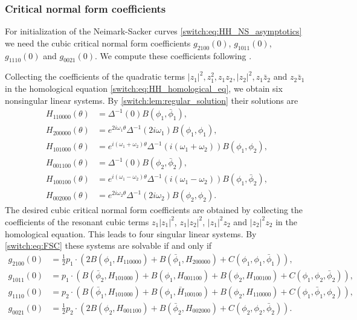 \subsubsection{Critical normal form coefficients}
For initialization of the Neimark-Sacker curves \cref{switch:eq:HH_NS_asymptotics} we need the cubic critical normal form coefficients $g_{2100}(0)$, $g_{1011}(0)$, $g_{1110}(0)$ and $g_{0021}(0)$. We compute these coefficients following \cite{Janssens:Thesis}.

Collecting the coefficients of the quadratic terms $|z_{1}|^{2},z_{1}^{2},z_{1}z_{2},|z_{2}|^{2},z_{1}\bar{z}_{2}$ and $z_{2}\bar{z}_{1}$ in the homological equation \cref{switch:eq:HH_homological_eq}, we obtain six nonsingular linear systems. By \cref{switch:lem:regular_solution} their solutions are
\begin{align*}
H_{110000}(\theta)& = \Delta^{-1}(0)B(\phi_{1},\bar{\phi}_{1}),\\
H_{200000}(\theta)& = e^{2i\omega_{1}\theta}\Delta^{-1}(2i\omega_{1})B(\phi_{1},\phi_{1}),\\
H_{101000}(\theta)& = e^{i\left(\omega_{1}+\omega_{2}\right)\theta}\Delta^{-1}(i\left(\omega_{1}+\omega_{2}\right))B(\phi_{1},\phi_{2}),\\
H_{001100}(\theta)& = \Delta^{-1}(0)B(\phi_{2},\bar{\phi}_{2}),\\
H_{100100}(\theta)& = e^{i\left(\omega_{1}-\omega_{2}\right)\theta}\Delta^{-1}(i\left(\omega_{1}-\omega_{2}\right))B(\phi_{1},\bar{\phi}_{2}),\\
H_{002000}(\theta)& = e^{2i\omega_{2}\theta}\Delta^{-1}(2i\omega_{2})B(\phi_{2},\phi_{2}).
\end{align*}
The desired cubic critical normal form coefficients are obtained by collecting the coefficients of the resonant cubic terms $z_{1}|z_{1}|^{2}$, $z_1|z_{2}|^{2}$, $|z_{1}|^{2}z_2$ and $|z_{2}|^{2}z_{2}$ in the homological equation. This leads to four singular linear systems. By \cref{switch:eq:FSC} these systems are solvable if and only if
\begin{align*}
g_{2100}(0) & =\frac{1}{2}p_{1}\cdot \left(2B(\phi_{1},H_{110000})+B(\bar{\phi}_{1},H_{200000})+C(\phi_{1},\phi_{1},\bar{\phi}_{1})\right),\\
g_{1011}(0) & =p_{1}\cdot \left(B(\bar{\phi}_{2},H_{101000})+B(\phi_{1},H_{001100})+B(\phi_{2},H_{100100})+C(\phi_{1},\phi_{2},\bar{\phi}_{2})\right),\\
g_{1110}(0) & =p_{2}\cdot \left(B(\bar{\phi}_{1},H_{101000})+B(\phi_{1},\bar{H}_{100100})+B(\phi_{2},H_{110000})+C(\phi_{1},\bar{\phi}_{1},\phi_{2})\right),\\
g_{0021}(0) & =\frac{1}{2}p_{2}\cdot \left(2B(\phi_{2},H_{001100})+B(\bar{\phi}_{2},H_{002000})+C(\phi_{2},\phi_{2},\bar{\phi}_{2})\right).
\end{align*}

